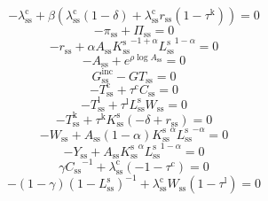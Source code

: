 \begin{equation}
-\lambda^{\mathrm{c}}_\mathrm{ss} + {\beta} \left({\lambda^{\mathrm{c}}_\mathrm{ss}} \left(1 - \delta\right) + {\lambda^{\mathrm{c}}_\mathrm{ss}} {r_\mathrm{ss}} \left(1 - \tau^{\mathrm{k}}\right)\right) = 0
\end{equation}
\begin{equation}
-\pi_\mathrm{ss} + \Pi_\mathrm{ss} = 0
\end{equation}
\begin{equation}
-r_\mathrm{ss} + {\alpha} {A_\mathrm{ss}} {{K^{\mathrm{s}}_\mathrm{ss}}^{-1 + \alpha}} {{L^{\mathrm{s}}_\mathrm{ss}}^{1 - \alpha}} = 0
\end{equation}
\begin{equation}
-A_\mathrm{ss} + e^{{\rho} {\log{A_\mathrm{ss}}}} = 0
\end{equation}
\begin{equation}
G^{\mathrm{inc}}_\mathrm{ss} - {G\!T}_\mathrm{ss} = 0
\end{equation}
\begin{equation}
-T^{\mathrm{c}}_\mathrm{ss} + {\tau^{\mathrm{c}}} {C_\mathrm{ss}} = 0
\end{equation}
\begin{equation}
-T^{\mathrm{l}}_\mathrm{ss} + {\tau^{\mathrm{l}}} {L^{\mathrm{s}}_\mathrm{ss}} {W_\mathrm{ss}} = 0
\end{equation}
\begin{equation}
-T^{\mathrm{k}}_\mathrm{ss} + {\tau^{\mathrm{k}}} {K^{\mathrm{s}}_\mathrm{ss}} \left(-\delta + r_\mathrm{ss}\right) = 0
\end{equation}
\begin{equation}
-W_\mathrm{ss} + {A_\mathrm{ss}} \left(1 - \alpha\right) {{K^{\mathrm{s}}_\mathrm{ss}}^{\alpha}} {{L^{\mathrm{s}}_\mathrm{ss}}^{-\alpha}} = 0
\end{equation}
\begin{equation}
-Y_\mathrm{ss} + {A_\mathrm{ss}} {{K^{\mathrm{s}}_\mathrm{ss}}^{\alpha}} {{L^{\mathrm{s}}_\mathrm{ss}}^{1 - \alpha}} = 0
\end{equation}
\begin{equation}
{\gamma} {C_\mathrm{ss}}^{-1} + {\lambda^{\mathrm{c}}_\mathrm{ss}} \left(-1 - \tau^{\mathrm{c}}\right) = 0
\end{equation}
\begin{equation}
-\left(1 - \gamma\right) \left(1 - L^{\mathrm{s}}_\mathrm{ss}\right)^{-1} + {\lambda^{\mathrm{c}}_\mathrm{ss}} {W_\mathrm{ss}} \left(1 - \tau^{\mathrm{l}}\right) = 0
\end{equation}
